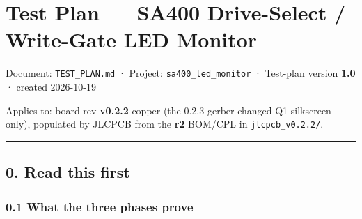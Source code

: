 \documentclass[
  10pt,
]{article}
\author{}
\date{}
\begin{document}
\hypertarget{test-plan-sa400-drive-select-write-gate-led-monitor}{%
\section{Test Plan --- SA400 Drive-Select / Write-Gate LED
Monitor}\label{test-plan-sa400-drive-select-write-gate-led-monitor}}

Document: \texttt{TEST\_PLAN.md} · Project:
\texttt{sa400\_led\_monitor} · Test-plan version
\textbf{1.0} · created 2026-10-19

Applies to: board rev \textbf{v0.2.2} copper (the 0.2.3
gerber changed Q1 silkscreen only), populated by JLCPCB from
the \textbf{r2} BOM/CPL in \texttt{jlcpcb\_v0.2.2/}.

\begin{center}\rule{0.5\linewidth}{0.5pt}\end{center}

\hypertarget{read-this-first}{%
\subsection{0. Read this first}\label{read-this-first}}

\hypertarget{what-the-three-phases-prove}{%
\subsubsection{0.1 What the three phases
prove}\label{what-the-three-phases-prove}}
\end{document}
